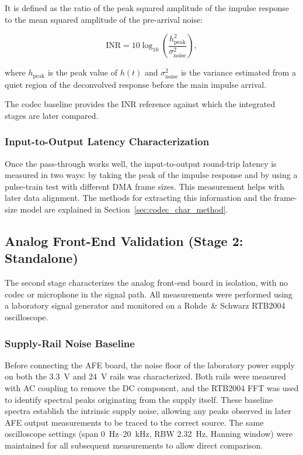 It is defined as the ratio of the peak squared amplitude of the impulse response to the mean squared amplitude of the pre-arrival noise:

\begin{equation}
\mathrm{INR} = 10\log_{10}\!\left( \frac{h_{\mathrm{peak}}^{2}}{\sigma_{\mathrm{noise}}^{2}} \right),
\label{eq:inr}
\end{equation}

where $h_{\mathrm{peak}}$ is the peak value of $h(t)$ and $\sigma_{\mathrm{noise}}^{2}$ is the variance estimated from a quiet region of the deconvolved response before the main impulse arrival.

The codec baseline provides the INR reference against which the integrated stages are later compared.

\subsubsection{Input-to-Output Latency Characterization}

Once the pass-through works well, the input-to-output round-trip latency is measured in two ways: by taking the peak of the impulse response and by using a pulse-train test with different DMA frame sizes. This measurement helps with later data alignment. The methods for extracting this information and the frame-size model are explained in Section~\ref{sec:codec_char_method}.







\subsection{Analog Front-End Validation (Stage 2: Standalone)}
\label{sec:afe_validation}

The second stage characterizes the analog front-end board in isolation, with no codec or microphone in the signal path. All measurements were performed using a laboratory signal generator and monitored on a Rohde~\& Schwarz RTB2004 oscilloscope.

\subsubsection{Supply-Rail Noise Baseline}

Before connecting the AFE board, the noise floor of the laboratory power supply on both the \SI{3.3}{\volt} and \SI{24}{\volt} rails was  characterized. Both rails were measured with AC coupling to remove the DC component, and the RTB2004 FFT was used to identify spectral peaks originating from the supply itself. These baseline spectra establish the intrinsic supply noise, allowing any peaks observed in later AFE output measurements to be traced to the correct source.
The same oscilloscope settings (span \SI{0}{\hertz}--\SI{20}{\kilo\hertz}, RBW \SI{2.32}{\hertz}, Hanning window) were maintained for all subsequent measurements to allow direct comparison.

